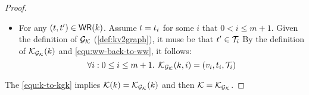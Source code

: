 \begin{proof}
\begin{itemize}
\begin{itemize}
    \item For any \( (t, t' ) \in \mathsf{WR}(k) \).
    Assume \( t = t_i \) for some \( i \) that \( 0 < i \leq m + 1\).
    Given the definition of \( \mathcal{G}_{\mathcal{K}} \) (\cref{def:kv2graph}), it muse be that \( t' \in \mathcal{T}_i \)
    By the definition of  \( \mathcal{K}_{\mathcal{G}_{\mathcal{K}}}(k) \) and \cref{equ:ww-back-to-ww}, it follows:
    \begin{equation}
        \label{equ:k-to-kgk}
        \forall i : 0 \leq i \leq m + 1 \ldotp \; \mathcal{K}_{\mathcal{G}_{\mathcal{K}}}(k, i) = (v_i, t_i, \mathcal{T}_i)
    \end{equation}
\end{itemize}
\end{itemize}
The \cref{equ:k-to-kgk} implies \( \mathcal{K}(k) = \mathcal{K}_{\mathcal{G}_{\mathcal{K}}}(k) \) and then \( \mathcal{K} = \mathcal{K}_{\mathcal{G}_{\mathcal{K}}} \).
\end{proof}
